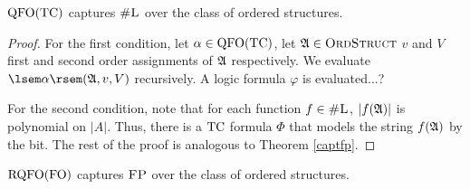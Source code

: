 \begin{theorem}
	${\rm QFO}({\rm TC})$ captures $\text{\sc \#L}$ over the class of ordered structures.
\end{theorem}
\begin{proof}
	For the first condition, let $\alpha\in{\rm QFO}({\rm TC})$, let $\mathfrak{A}\in\text{\sc OrdStruct}$ $v$ and $V$ first and second order assignments of $\mathfrak{A}$ respectively. We evaluate $\sem{\alpha}(\A,v,V)$ recursively. A logic formula $\varphi$ is evaluated...?
	
	For the second condition, note that for each function $f\in \text{\sc \#L}$, $\vert f(\mathfrak{A}) \vert$ is polynomial on $\vert A \vert$. Thus, there is a ${\rm TC}$ formula $\Phi$ that models the string $f(\mathfrak{A})$ by the bit. The rest of the proof is analogous to Theorem \ref{captfp}.
\end{proof}

\begin{theorem}
	${\rm RQFO}({\rm FO})$ captures $\text{\sc FP}$ over the class of ordered structures.
\end{theorem}

